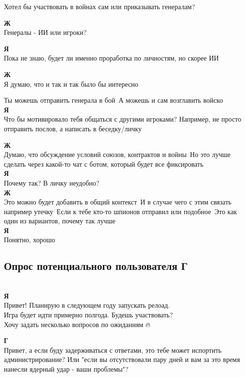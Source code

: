 Хотел бы участвовать в войнах сам или приказывать генералам?

\textbf{Ж}\\
Генералы - ИИ или игроки?

\textbf{Я}\\
Пока не знаю, будет ли именно проработка по личностям, но скорее ИИ

\textbf{Ж}\\
Я думаю, что и так и так было бы интересно

Ты можешь отправить генерала в бой\
А можешь и сам возглавить войско\\

\textbf{Я}\\
Что бы мотивировало тебя общаться с другими игроками? Например, не просто отправить послов, а написать в беседку/личку

\textbf{Ж}\\
Думаю, что обсуждение условий союзов, контрактов и войны\
Но это лучше сделать через какой-то чат с ботом, который будет все фиксировать\\

\textbf{Я}\\
Почему так? В личку неудобно?\\

\textbf{Ж}\\
Это можно будет добавить в общий контекст\
И в случае чего с этим связать например утечку\
Если к тебе кто-то шпионов отправил или подобное\
Это как один из вариантов, почему так лучше\\

\textbf{Я}\\
Понятно, хорошо

\subsection{Опрос потенциального пользователя Г}\\
\textbf{Я}\\
Привет! Планирую в следующем году запускать релоад.\\
Игра будет идти примерно полгода. Будешь участвовать?\\
Хочу задать несколько вопросов по ожиданиям 🔥🎅

\textbf{Г}\\
Привет, а если буду задерживаться с ответами, это тебе может испортить администрирование? Или "если вы отсутствовали пару дней и вам за это время нанесли ядерный удар - ваши проблемы"?

